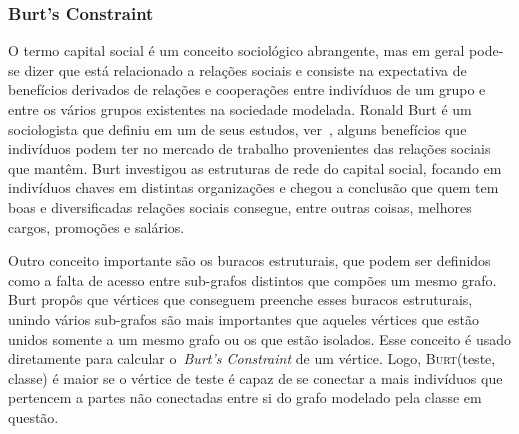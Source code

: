 \subsubsection{Burt's Constraint}
\label{subsubsection::constraint}

O termo capital social é um conceito sociológico abrangente, mas em geral pode-se dizer que está relacionado a relações sociais e consiste na expectativa de benefícios derivados de relações e cooperações entre indivíduos de um grupo e entre os vários grupos existentes na sociedade modelada. Ronald Burt é um sociologista que definiu em um de seus estudos, ver~\cite{Burt92}, alguns benefícios que indivíduos podem ter no mercado de trabalho provenientes das relações sociais que mantêm. Burt investigou as estruturas de rede do capital social, focando em indivíduos chaves em distintas organizações e chegou a conclusão que quem tem boas e diversificadas relações sociais consegue, entre outras coisas, melhores cargos, promoções e salários.  

Outro conceito importante são os buracos estruturais, que podem ser definidos como a falta de acesso entre sub-grafos distintos que compões um mesmo grafo. Burt propôs que vértices que conseguem preenche esses buracos estruturais, unindo vários sub-grafos são mais importantes que aqueles vértices que estão unidos somente a um mesmo grafo ou os que estão isolados. Esse conceito é usado diretamente para calcular o~\textit{Burt's Constraint} de um vértice. Logo, \textsc{Burt}(teste, classe) é maior se o vértice de teste é capaz de se conectar a mais indivíduos que pertencem a partes não conectadas entre si do grafo modelado pela classe em questão.

